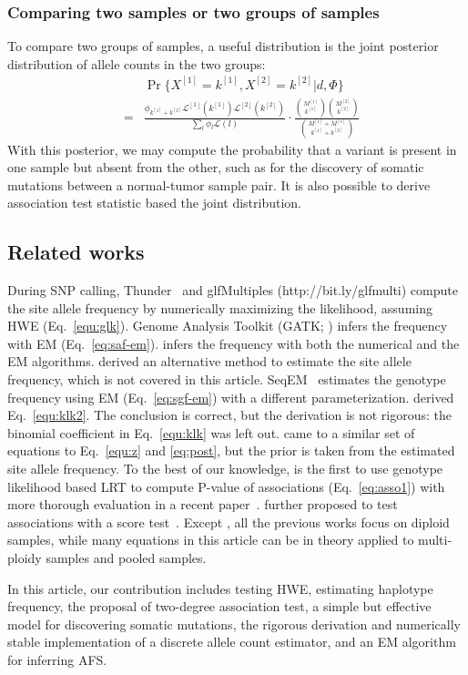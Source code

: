 \documentclass{bioinfo}
\begin{document}
\begin{methods}
\subsubsection{Comparing two samples or two groups of samples}
To compare two groups of samples, a useful distribution is the joint posterior
distribution of allele counts in the two groups:
\begin{eqnarray*}
&&\Pr\{X^{[1]}=k^{[1]},X^{[2]}=k^{[2]}|d,\Phi\}\\
&=&\frac{\phi_{k^{[1]}+k^{[2]}}\mathcal{L}^{[1]}(k^{[1]})\mathcal{L}^{[2]}(k^{[2]})}{\sum_l\phi_l\mathcal{L}(l)}
\cdot\frac{\binom{M^{[1]}}{k^{[1]}}\binom{M^{[2]}}{k^{[2]}}}{\binom{M^{[1]}+M^{[1]}}{k^{[1]}+k^{[2]}}}
\end{eqnarray*}
With this posterior, we may compute the probability that a variant is present
in one sample but absent from the other, such as for the discovery of somatic
mutations between a normal-tumor sample pair. It is also possible to derive
association test statistic based the joint distribution.

\subsection{Related works}
During SNP calling, Thunder~\citep{Li:2011fk} and glfMultiples
(http://bit.ly/glfmulti) compute the site allele frequency by numerically
maximizing the likelihood, assuming HWE (Eq.~\eqref{equ:glk}). Genome Analysis
Toolkit (GATK; \citealp{Depristo:2011vn}) infers the frequency with EM
(Eq.~\eqref{eq:saf-em}).  \citet{Kim:2011fk} infers the frequency with both the
numerical and the EM algorithms.  \citet{Li:2010ys} derived an alternative
method to estimate the site allele frequency, which is not covered in this
article.  SeqEM~\citep{Martin:2010dz} estimates the genotype frequency using EM
(Eq.~\eqref{eq:sgf-em}) with a different parameterization.  \citet{Le:2010uq}
derived Eq.~\eqref{equ:klk2}. The conclusion is correct, but the derivation is
not rigorous: the binomial coefficient in Eq.~\eqref{equ:klk} was left out.
\citet{Yi:2010zr} came to a similar set of equations to Eq.~\eqref{equ:z} and
\eqref{eq:post}, but the prior is taken from the estimated site allele
frequency.  To the best of our knowledge, \citet{Kim:2010ve} is the first to
use genotype likelihood based LRT to compute P-value of associations
(Eq.~\eqref{eq:asso1}) with more thorough evaluation in a recent
paper~\citep{Kim:2011fk}. \citet{Nielsen:2011fk} further proposed to test
associations with a score test~\citep{Schaid:2002qf}.  Except
\citet{Kim:2010ve}, all the previous works focus on diploid samples, while many
equations in this article can be in theory applied to multi-ploidy samples and
pooled samples.

In this article, our contribution includes testing HWE, estimating haplotype
frequency, the proposal of two-degree association test, a simple but effective
model for discovering somatic mutations, the rigorous derivation and
numerically stable implementation of a discrete allele count estimator, and an
EM algorithm for inferring AFS.

\end{methods}
\end{document}
